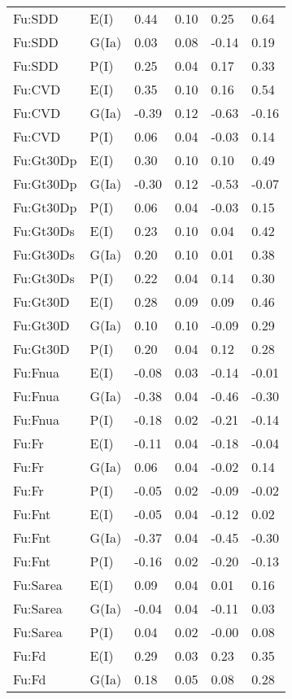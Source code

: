\begin{center}
\begin{longtable}{|p{1.1in}|p{0.7in}|p{0.7in}|p{0.6in}|p{0.6in}|p{0.6in}|}
  Fu:SDD & E(I) & 0.44 & 0.10 & 0.25 & 0.64 \\ 
  Fu:SDD & G(Ia) & 0.03 & 0.08 & -0.14 & 0.19 \\ 
  Fu:SDD & P(I) & 0.25 & 0.04 & 0.17 & 0.33 \\ 
  Fu:CVD & E(I) & 0.35 & 0.10 & 0.16 & 0.54 \\ 
  Fu:CVD & G(Ia) & -0.39 & 0.12 & -0.63 & -0.16 \\ 
  Fu:CVD & P(I) & 0.06 & 0.04 & -0.03 & 0.14 \\ 
  Fu:Gt30Dp & E(I) & 0.30 & 0.10 & 0.10 & 0.49 \\ 
  Fu:Gt30Dp & G(Ia) & -0.30 & 0.12 & -0.53 & -0.07 \\ 
  Fu:Gt30Dp & P(I) & 0.06 & 0.04 & -0.03 & 0.15 \\ 
  Fu:Gt30Ds & E(I) & 0.23 & 0.10 & 0.04 & 0.42 \\ 
  Fu:Gt30Ds & G(Ia) & 0.20 & 0.10 & 0.01 & 0.38 \\ 
  Fu:Gt30Ds & P(I) & 0.22 & 0.04 & 0.14 & 0.30 \\ 
  Fu:Gt30D & E(I) & 0.28 & 0.09 & 0.09 & 0.46 \\ 
  Fu:Gt30D & G(Ia) & 0.10 & 0.10 & -0.09 & 0.29 \\ 
  Fu:Gt30D & P(I) & 0.20 & 0.04 & 0.12 & 0.28 \\ 
  Fu:Fnua & E(I) & -0.08 & 0.03 & -0.14 & -0.01 \\ 
  Fu:Fnua & G(Ia) & -0.38 & 0.04 & -0.46 & -0.30 \\ 
  Fu:Fnua & P(I) & -0.18 & 0.02 & -0.21 & -0.14 \\ 
  Fu:Fr & E(I) & -0.11 & 0.04 & -0.18 & -0.04 \\ 
  Fu:Fr & G(Ia) & 0.06 & 0.04 & -0.02 & 0.14 \\ 
  Fu:Fr & P(I) & -0.05 & 0.02 & -0.09 & -0.02 \\ 
  Fu:Fnt & E(I) & -0.05 & 0.04 & -0.12 & 0.02 \\ 
  Fu:Fnt & G(Ia) & -0.37 & 0.04 & -0.45 & -0.30 \\ 
  Fu:Fnt & P(I) & -0.16 & 0.02 & -0.20 & -0.13 \\ 
  Fu:Sarea & E(I) & 0.09 & 0.04 & 0.01 & 0.16 \\ 
  Fu:Sarea & G(Ia) & -0.04 & 0.04 & -0.11 & 0.03 \\ 
  Fu:Sarea & P(I) & 0.04 & 0.02 & -0.00 & 0.08 \\ 
  Fu:Fd & E(I) & 0.29 & 0.03 & 0.23 & 0.35 \\ 
  Fu:Fd & G(Ia) & 0.18 & 0.05 & 0.08 & 0.28 \\ 

\end{longtable}
\end{center}
